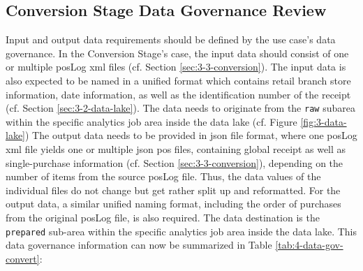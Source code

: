 \subsection{Conversion Stage Data Governance Review}
Input and output data requirements should be defined by the use case's data governance. In the Conversion Stage's case, the input data should consist of one or multiple \ac{pos}Log \ac{xml} files (cf. Section \ref{sec:3-3-conversion}). The input data is also expected to be named in a unified format which contains retail branch store information, date information, as well as the identification number of the receipt (cf. Section \ref{sec:3-2-data-lake}). The data needs to originate from the \texttt{raw} subarea within the specific analytics job area inside the data lake (cf. Figure \ref{fig:3-data-lake}) The output data needs to be provided in \ac{json} file format, where one \ac{pos}Log \ac{xml} file yields one or multiple \ac{json} \ac{pos} files, containing global receipt as well as single-purchase information (cf. Section \ref{sec:3-3-conversion}), depending on the number of items from the source \ac{pos}Log file. Thus, the data values of the individual files do not change but get rather split up and reformatted. For the output data, a similar unified naming format, including the order of purchases from the original \ac{pos}Log file, is also required. The data destination is the \texttt{prepared} sub-area within the specific analytics job area inside the data lake. This data governance information can now be summarized in Table \ref{tab:4-data-gov-convert}:


